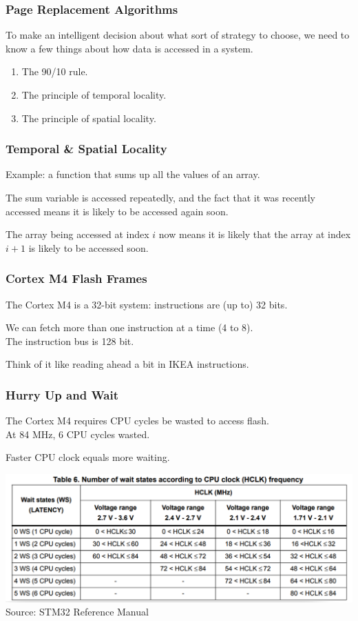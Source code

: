 \begin{frame}
\frametitle{Page Replacement Algorithms}
To make an intelligent decision about what sort of strategy to choose, we need to know a few things about how data is accessed in a system.



\begin{enumerate}
	\item The 90/10 rule.
	\item The principle of \alert{temporal locality}. 
	\item The principle of \alert{spatial locality}.
\end{enumerate}

\end{frame}

\begin{frame}
\frametitle{Temporal \& Spatial Locality}

Example: a function that sums up all the values of an array. 

The sum variable is accessed repeatedly, and the fact that it was recently accessed means it is likely to be accessed again soon. 

The array being accessed at index $i$ now means it is likely that the array at index $i+1$ is likely to be accessed soon.

\end{frame}

\begin{frame}
\frametitle{Cortex M4 Flash Frames}

The Cortex M4 is a 32-bit system: instructions are (up to) 32 bits.

We can fetch more than one instruction at a time (4 to 8).\\
\quad The instruction bus is 128 bit.

Think of it like reading ahead a bit in IKEA instructions.

\end{frame}

\begin{frame}
\frametitle{Hurry Up and Wait}

The Cortex M4 requires CPU cycles be wasted to access flash.\\
\quad At 84 MHz, 6 CPU cycles wasted.

Faster CPU clock equals more waiting.

\begin{center}
  \includegraphics[width=\textwidth]{images/waitstates.png}\\
  \hfill Source: STM32 Reference Manual
\end{center}

\end{frame}

